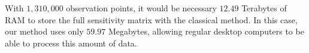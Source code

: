 \documentclass[manuscript]{geophysics}
\begin{document}
With $1,310,000$ observation points, it would be necessary $12.49$ Terabytes of RAM to store the full
sensitivity matrix with the classical method. 
In this case, our method uses only $59.97$ Megabytes, allowing regular desktop computers to be able 
to process this amount of data.


%
%
%
%

%
%



\end{document}
